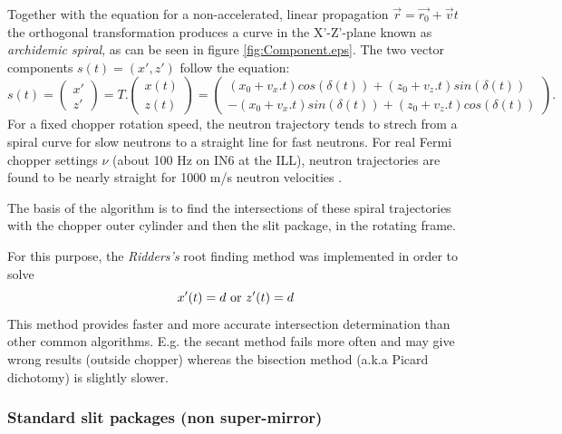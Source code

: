 Together with the equation for a non-accelerated, linear propagation $\vec{r} = \vec{r_0}+\vec{v}t$ the orthogonal transformation produces a curve in the X'-Z'-plane known as \emph{archidemic spiral}, as can be seen in figure \ref{fig:Component.eps}. The two vector components $s(t) = (x',z')$ follow the equation:
\begin{equation}
s(t) = \left(
\begin{array}{c}
x' \\
z'
\end{array}
\right) = T.\left(
\begin{array}{c}
x(t) \\
z(t)
\end{array}
\right) = \left(
\begin{array}{c}
(x_0+v_x.t)cos(\delta(t)) + (z_0+v_z.t)sin(\delta(t)) \\
-(x_0+v_x.t)sin(\delta(t)) + (z_0+v_z.t)cos(\delta(t))
\end{array}
\right).
\label{eq:Txz}
\end{equation}
For a fixed chopper rotation speed, the neutron trajectory tends to strech from a spiral curve for slow neutrons to a straight line for fast neutrons. For real Fermi chopper settings $\nu$ (about 100 Hz on IN6 at the ILL), neutron trajectories are found to be nearly straight for 1000 m/s neutron velocities \cite{blanc83}.

The basis of the algorithm is to find the intersections of these spiral trajectories with the chopper outer cylinder and then the slit package, in the rotating frame.

For this purpose, the \emph{Ridders's} root finding method was implemented \cite{NumRecip} in order to solve
\begin{equation}
x'(t) = d {\rm\ or\ } z'(t) = d
\label{eq:Ridder}
\end{equation}
This method provides faster and more accurate intersection determination than other common algorithms. E.g. the secant method fails more often and may give wrong results (outside chopper) whereas the bisection method (a.k.a Picard dichotomy) is slightly slower.

\subsubsection{Standard slit packages (non super-mirror)}


